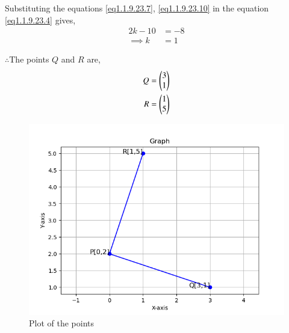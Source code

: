 \documentclass[journal]{IEEEtran}
\begin{document}
Substituting the equations \ref{eq1.1.9.23.7}, \ref{eq1.1.9.23.10} in the equation \ref{eq1.1.9.23.4} gives,
\begin{align}
    2k-10&=-8\label{eq1.1.9.23.11}\\
    \implies k&=1\label{eq1.1.9.23.12}
\end{align}

$\therefore$The points $Q$ and $R$ are,
\begin{align}
    Q&=\begin{pmatrix}3\\1\\\end{pmatrix}\label{eq1.1.9.23.13}\\
    R&=\begin{pmatrix}1\\5\\\end{pmatrix}\label{eq1.1.9.23.14}
\end{align}


\begin{figure}[h!]
\renewcommand{\thefigure}{1}
    \centering
    \includegraphics[width=0.7\linewidth]{figs/plot.png}
    \caption{Plot of the points}
    \label{fig1.1.5.10.1}
\end{figure}
\end{document}
